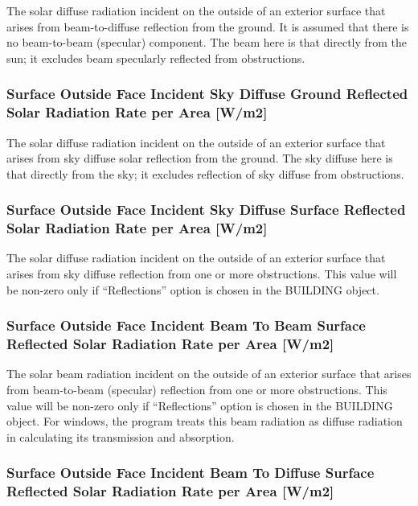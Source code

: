The solar diffuse radiation incident on the outside of an exterior surface that arises from beam-to-diffuse reflection from the ground. It is assumed that there is no beam-to-beam (specular) component. The beam here is that directly from the sun; it excludes beam specularly reflected from obstructions.

\subsubsection{Surface Outside Face Incident Sky Diffuse Ground Reflected Solar Radiation Rate per Area {[}W/m2{]}}\label{surface-outside-face-incident-sky-diffuse-ground-reflected-solar-radiation-rate-per-area-wm2}

The solar diffuse radiation incident on the outside of an exterior surface that arises from sky diffuse solar reflection from the ground. The sky diffuse here is that directly from the sky; it excludes reflection of sky diffuse from obstructions.

\subsubsection{Surface Outside Face Incident Sky Diffuse Surface Reflected Solar Radiation Rate per Area {[}W/m2{]}}\label{surface-outside-face-incident-sky-diffuse-surface-reflected-solar-radiation-rate-per-area-wm2}

The solar diffuse radiation incident on the outside of an exterior surface that arises from sky diffuse reflection from one or more obstructions. This value will be non-zero only if ``Reflections'' option is chosen in the BUILDING object.

\subsubsection{Surface Outside Face Incident Beam To Beam Surface Reflected Solar Radiation Rate per Area {[}W/m2{]}}\label{surface-outside-face-incident-beam-to-beam-surface-reflected-solar-radiation-rate-per-area-wm2}

The solar beam radiation incident on the outside of an exterior surface that arises from beam-to-beam (specular) reflection from one or more obstructions. This value will be non-zero only if ``Reflections'' option is chosen in the BUILDING object. For windows, the program treats this beam radiation as diffuse radiation in calculating its transmission and absorption.

\subsubsection{Surface Outside Face Incident Beam To Diffuse Surface Reflected Solar Radiation Rate per Area {[}W/m2{]}}\label{surface-outside-face-incident-beam-to-diffuse-surface-reflected-solar-radiation-rate-per-area-wm2}


